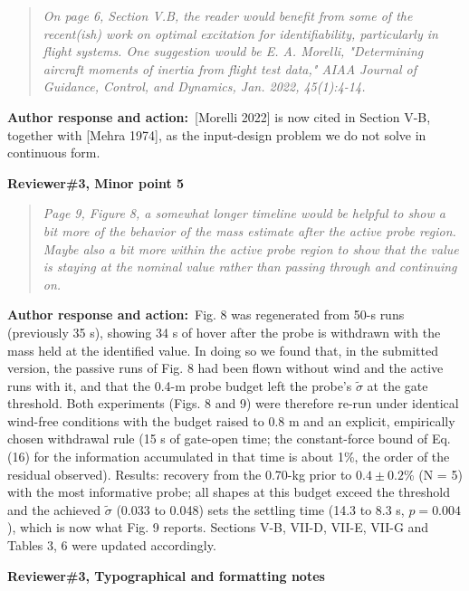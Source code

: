 \documentclass[11pt]{article}
\newcommand{\concern}[1]{\par\medskip\noindent\colorbox{gray!12}{\parbox{\dimexpr\linewidth-2\fboxsep}{\textbf{#1}}}\par\smallskip}
\newcommand{\rlabel}[1]{\par\textbf{#1}\ }
\begin{document}
\begin{quote}\itshape On page 6, Section V.B, the reader would benefit from some of the recent(ish) work on optimal excitation for identifiability, particularly in flight systems. One suggestion would be E. A. Morelli, "Determining aircraft moments of inertia from flight test data," AIAA Journal of Guidance, Control, and Dynamics, Jan. 2022, 45(1):4-14.\end{quote}

\rlabel{Author response and action:}[Morelli 2022] is now cited in Section V-B, together with [Mehra 1974], as the input-design problem we do not solve in continuous form.

\concern{Reviewer\#3, Minor point 5}

\begin{quote}\itshape Page 9, Figure 8, a somewhat longer timeline would be helpful to show a bit more of the behavior of the mass estimate after the active probe region. Maybe also a bit more within the active probe region to show that the value is staying at the nominal value rather than passing through and continuing on.\end{quote}

\rlabel{Author response and action:}Fig. 8 was regenerated from 50-s runs (previously 35 s), showing 34 s of hover after the probe is withdrawn with the mass held at the identified value. In doing so we found that, in the submitted version, the passive runs of Fig. 8 had been flown without wind and the active runs with it, and that the 0.4-m probe budget left the probe's $\tilde\sigma$ at the gate threshold. Both experiments (Figs. 8 and 9) were therefore re-run under identical wind-free conditions with the budget raised to 0.8 m and an explicit, empirically chosen withdrawal rule (15 s of gate-open time; the constant-force bound of Eq. (16) for the information accumulated in that time is about 1\%, the order of the residual observed). Results: recovery from the 0.70-kg prior to $0.4 \pm 0.2$\% (N = 5) with the most informative probe; all shapes at this budget exceed the threshold and the achieved $\tilde\sigma$ (0.033 to 0.048) sets the settling time (14.3 to 8.3 s, $p = 0.004$), which is now what Fig. 9 reports. Sections V-B, VII-D, VII-E, VII-G and Tables 3, 6 were updated accordingly.

\concern{Reviewer\#3, Typographical and formatting notes}
\end{document}
